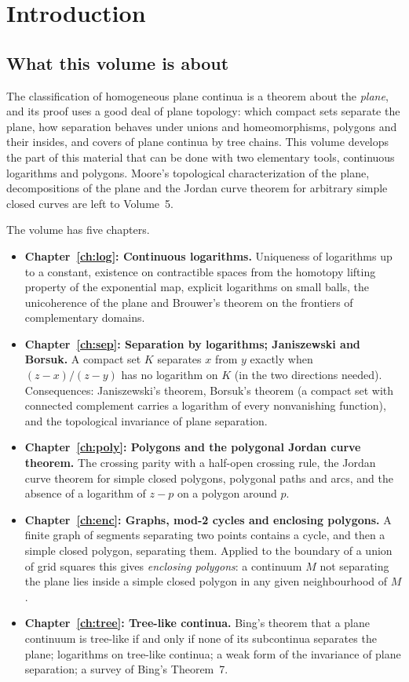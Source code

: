 \chapter{Introduction}\label{ch:intro}

\section{What this volume is about}

The classification of homogeneous plane continua is a theorem about the \emph{plane}, and its proof
uses a good deal of plane topology: which compact sets separate the plane, how separation behaves
under unions and homeomorphisms, polygons and their insides, and covers of plane continua by
tree chains. This volume develops the part of this material that can be done with two elementary
tools, continuous logarithms and polygons. Moore's topological characterization of the plane,
decompositions of the plane and the Jordan curve theorem for arbitrary simple closed curves are
left to Volume~5.

The volume has five chapters.

\begin{itemize}
\item \textbf{Chapter~\ref{ch:log}: Continuous logarithms.} Uniqueness of logarithms up to a
constant, existence on contractible spaces from the homotopy lifting property of the exponential
map, explicit logarithms on small balls, the unicoherence of the plane and Brouwer's theorem on the
frontiers of complementary domains.
\item \textbf{Chapter~\ref{ch:sep}: Separation by logarithms; Janiszewski and Borsuk.} A compact set
$K$ separates $x$ from $y$ exactly when $(z-x)/(z-y)$ has no logarithm on $K$ (in the two directions
needed). Consequences: Janiszewski's theorem, Borsuk's theorem (a compact set with connected
complement carries a logarithm of every nonvanishing function), and the topological invariance of
plane separation.
\item \textbf{Chapter~\ref{ch:poly}: Polygons and the polygonal Jordan curve theorem.} The crossing
parity with a half-open crossing rule, the Jordan curve theorem for simple closed polygons,
polygonal paths and arcs, and the absence of a logarithm of $z-p$ on a polygon around $p$.
\item \textbf{Chapter~\ref{ch:enc}: Graphs, mod-2 cycles and enclosing polygons.} A finite graph of
segments separating two points contains a cycle, and then a simple closed polygon, separating them.
Applied to the boundary of a union of grid squares this gives \emph{enclosing polygons}: a continuum
$M$ not separating the plane lies inside a simple closed polygon in any given neighbourhood of $M$.
\item \textbf{Chapter~\ref{ch:tree}: Tree-like continua.} Bing's theorem that a plane continuum is
tree-like if and only if none of its subcontinua separates the plane; logarithms on tree-like
continua; a weak form of the invariance of plane separation; a survey of Bing's Theorem~7.
\end{itemize}

